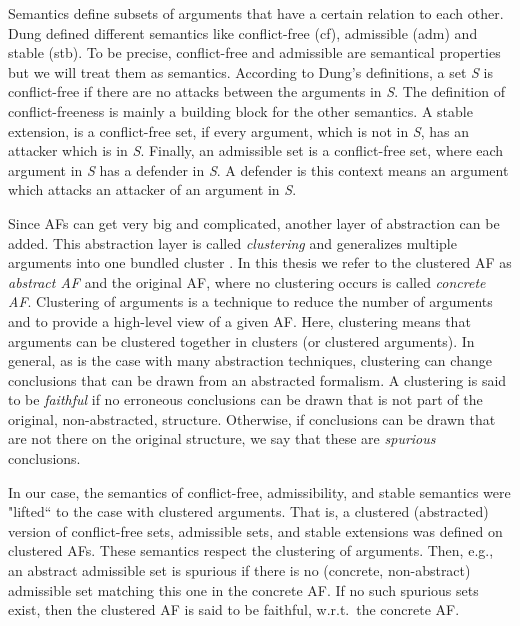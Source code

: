 Semantics define subsets of arguments that have a certain relation to each other. Dung defined different semantics \cite{Dung1995-DUNOTA-2} like conflict-free (cf), admissible (adm) and stable (stb). To be precise, conflict-free and admissible are semantical properties but we will treat them as semantics. According to Dung's definitions, a set \textit{S} is conflict-free if there are no attacks between the arguments in \textit{S}. The definition of conflict-freeness is mainly a building block for the other semantics.
A stable extension, is a conflict-free set, if every argument, which is not in \textit{S}, has an attacker which is in \textit{S}.
Finally, an admissible set is a conflict-free set, where each argument in \textit{S} has a defender in \textit{S}. A defender is this context means an argument which attacks an attacker of an argument in \textit{S}.


Since AFs can get very big and complicated, another layer of abstraction can be added. This abstraction layer is called \emph{clustering} and generalizes multiple arguments into one bundled cluster \cite{DBLP:conf/kr/SaribaturW21}. In this thesis we refer to the clustered AF as \emph{abstract AF} and the original AF, where no clustering occurs is called \emph{concrete AF}.
Clustering of arguments is a technique to reduce the number of arguments and to provide a high-level view of a given AF. Here, clustering means that arguments can be clustered together in clusters (or clustered arguments). In general, as is the case with many abstraction techniques, clustering can change conclusions that can be drawn from an abstracted formalism. A clustering is said to be \emph{faithful} if no erroneous conclusions can be drawn that is not part of the original, non-abstracted, structure. Otherwise, if conclusions can be drawn that are not there on the original structure, we say that these are \emph{spurious} conclusions.

In our case, the semantics of conflict-free, admissibility, and stable semantics were "lifted`` to the case with clustered arguments. That is, a clustered (abstracted) version of conflict-free sets, admissible sets, and stable extensions was defined on clustered AFs. These semantics respect the clustering of arguments. Then, e.g., an abstract admissible set is spurious if there is no (concrete, non-abstract) admissible set matching this one in the concrete AF. If no such spurious sets exist, then the clustered AF is said to be faithful, w.r.t.\ the concrete AF.






